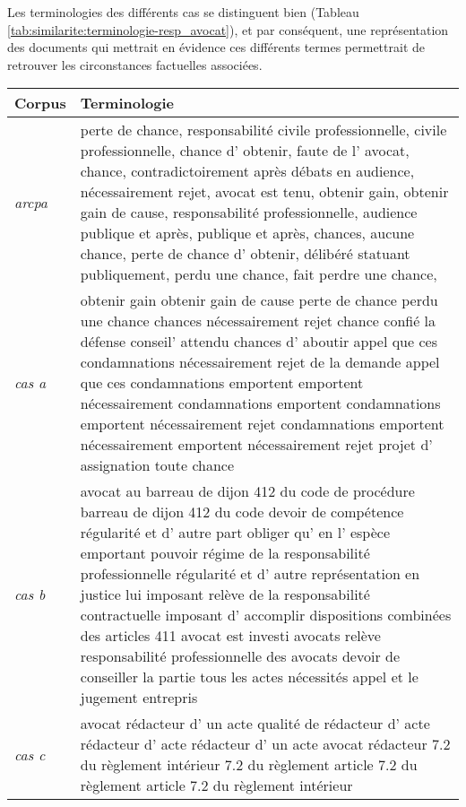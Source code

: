 Les terminologies des différents cas se distinguent bien (Tableau \ref{tab:similarite:terminologie-resp_avocat}), et par conséquent, une représentation des documents qui mettrait en évidence ces différents termes permettrait de retrouver les circonstances factuelles associées. 
\begin{table}[h]
	\centering \scriptsize
	\begin{tabular}{|l|p{}|}
		\hline
		\textbf{Corpus} & \textbf{Terminologie} \\ \hline
		\textit{arcpa} & perte de chance, 
		responsabilité civile professionnelle, 
		civile professionnelle, 
		chance d' obtenir, 
		faute de l' avocat, 
		chance, 
		contradictoirement après débats en audience, 
		nécessairement rejet, 
		avocat est tenu, 
		obtenir gain, 
		obtenir gain de cause, 
		responsabilité professionnelle, 
		audience publique et après, 
		publique et après, 
		chances, 
		aucune chance, 
		perte de chance d' obtenir, 
		délibéré statuant publiquement, 
		perdu une chance, 
		fait perdre une chance, 		
		\\ \hline
		\textit{cas a} & obtenir gain
		obtenir gain de cause
		perte de chance
		perdu une chance
		chances
		nécessairement rejet
		chance
		confié la défense
		conseil' attendu
		chances d' aboutir
		appel que ces condamnations
		nécessairement rejet de la demande
		appel que ces condamnations emportent
		emportent nécessairement
		condamnations emportent
		condamnations emportent nécessairement rejet
		condamnations emportent nécessairement
		emportent nécessairement rejet
		projet d' assignation
		toute chance		
		\\ \hline
		\textit{cas b} & avocat au barreau de dijon
		412 du code de procédure
		barreau de dijon
		412 du code
		devoir de compétence
		régularité et d' autre part
		obliger qu' en l' espèce
		emportant pouvoir
		régime de la responsabilité professionnelle
		régularité et d' autre
		représentation en justice lui imposant
		relève de la responsabilité contractuelle
		imposant d' accomplir
		dispositions combinées des articles 411
		avocat est investi
		avocats relève
		responsabilité professionnelle des avocats
		devoir de conseiller la partie
		tous les actes nécessités
		appel et le jugement entrepris		 
		\\ \hline
		\textit{cas c} &avocat rédacteur d' un acte
		qualité de rédacteur d' acte
		rédacteur d' acte
		rédacteur d' un acte
		avocat rédacteur
		7.2 du règlement intérieur
		7.2 du règlement
		article 7.2 du règlement
		article 7.2 du règlement intérieur

\end{tabular}
\end{table}
